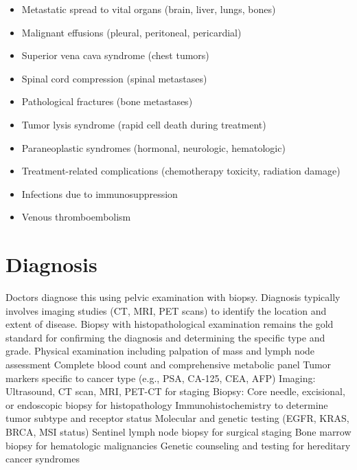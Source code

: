 \begin{itemize}[noitemsep]
  \item Metastatic spread to vital organs (brain, liver, lungs, bones)
  \item Malignant effusions (pleural, peritoneal, pericardial)
  \item Superior vena cava syndrome (chest tumors)
  \item Spinal cord compression (spinal metastases)
  \item Pathological fractures (bone metastases)
  \item Tumor lysis syndrome (rapid cell death during treatment)
  \item Paraneoplastic syndromes (hormonal, neurologic, hematologic)
  \item Treatment-related complications (chemotherapy toxicity, radiation damage)
  \item Infections due to immunosuppression
  \item Venous thromboembolism
\end{itemize}
\section{Diagnosis}
Doctors diagnose this using pelvic examination with biopsy. Diagnosis typically involves imaging studies (CT, MRI, PET scans) to identify the location and extent of disease. Biopsy with histopathological examination remains the gold standard for confirming the diagnosis and determining the specific type and grade. Physical examination including palpation of mass and lymph node assessment Complete blood count and comprehensive metabolic panel Tumor markers specific to cancer type (e.g., PSA, CA-125, CEA, AFP) Imaging: Ultrasound, CT scan, MRI, PET-CT for staging Biopsy: Core needle, excisional, or endoscopic biopsy for histopathology Immunohistochemistry to determine tumor subtype and receptor status Molecular and genetic testing (EGFR, KRAS, BRCA, MSI status) Sentinel lymph node biopsy for surgical staging Bone marrow biopsy for hematologic malignancies Genetic counseling and testing for hereditary cancer syndromes

